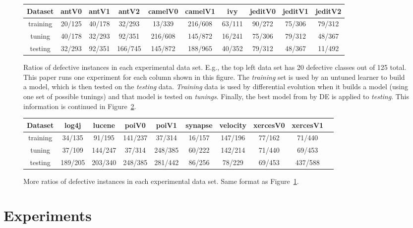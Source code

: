 \documentclass{sig-alternative}
\newcommand{\fig}[1]{Figure~\ref{fig:#1}}
\def\baselinestretch{1}
\begin{document}
\begin{figure}[!ht]

\renewcommand{\baselinestretch}{0.8}
\scriptsize
\centering
  \begin{tabular}{c c c c c c c c c c }\hline
  Dataset &antV0&antV1&antV2&camelV0&camelV1&ivy&jeditV0&jeditV1&jeditV2
\\\hline
  training &20/125 &40/178 &32/293 &13/339 &216/608 &63/111 &90/272 &75/306 &79/312
\\  tuning  &40/178 &32/293 &92/351 &216/608 &145/872 &16/241 &75/306 &79/312 &48/367
\\  testing &32/293 &92/351 &166/745 &145/872 &188/965 &40/352 &79/312 &48/367 &11/492
\\  \end{tabular}
   \caption{Ratios of defective instances in each experimental data set. 
   E.g., the top left data set has 20 defective classes out of 125 total.
   This paper runs one experiment for each column
   shown in this figure. The {\em training} set is used by an untuned learner
   to build a model, which is then tested on the {\em testing} data.
   {\em Training} data is used by  differential evolution when it builds
    a model (using one set of possible tunings) and that model is tested on {\em tunings}.
    Finally, the best model from by DE is applied to {\em testing}. 
   This information is continued  in \fig{data2}. 
   }\label{fig:data1}
\end{figure}
\begin{figure}[!ht]
\scriptsize
\centering
  \begin{tabular}{c c c c c c c c c c }
  \hline\hline
  Dataset &log4j&lucene&poiV0&poiV1&synapse&velocity&xercesV0&xercesV1
\\\hline
  training &34/135 &91/195 &141/237 &37/314 &16/157 &147/196 &77/162 &71/440
\\  tuning  &37/109 &144/247 &37/314 &248/385 &60/222 &142/214 &71/440 &69/453
\\  testing &189/205 &203/340 &248/385 &281/442 &86/256 &78/229 &69/453 &437/588
\\  \end{tabular}

   \caption{More ratios of  defective instances in each experimental data set. 
   Same format as \fig{data1}.}\label{fig:data2}
\end{figure}


\section{Experiments}
\end{document}
